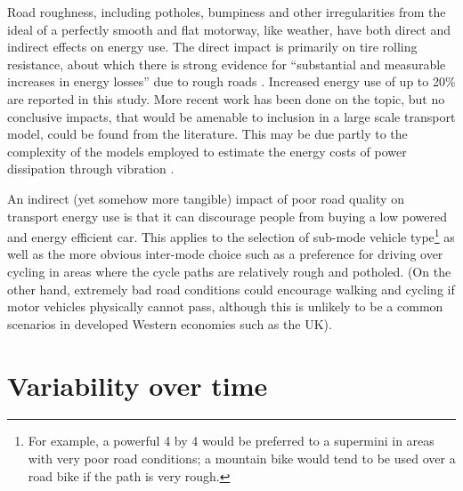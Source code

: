 Road roughness, including potholes, bumpiness and other irregularities
from the ideal of a perfectly smooth and flat motorway, like weather, have
both direct and indirect effects on energy use. The direct impact is primarily
on tire rolling resistance, about which there is strong evidence for
``substantial and measurable increases in energy losses'' due to
rough roads \citep{velinsky1980vehicle}. Increased energy use of up to
20\% are reported in this study. More recent work has been done on the topic,
but no conclusive impacts, that would be amenable to inclusion in a
large scale transport model, could be found from the literature.
This may be due partly to the complexity of the models employed to
estimate the energy costs of power dissipation through vibration
\citep{smith2011power}.

An indirect (yet somehow more tangible) impact of poor road quality on
transport energy use is that it can discourage people from buying
a low powered and energy efficient car.
This applies to the selection of sub-mode vehicle
type\footnote{For example,
a powerful 4 by 4 would be
preferred to a supermini in areas with very poor road conditions; a
mountain bike would tend to be used over a road bike if the path is
very rough.
}
as well as the more obvious inter-mode choice such as a
preference for driving over cycling
in areas where the cycle paths are relatively rough and potholed.
(On the other hand, extremely bad road conditions could encourage
walking and cycling if motor vehicles physically cannot pass, although
this is unlikely to be a common scenarios in developed Western economies
such as the UK). 


\section{Variability over time} %
\label{s:eff-imps}
